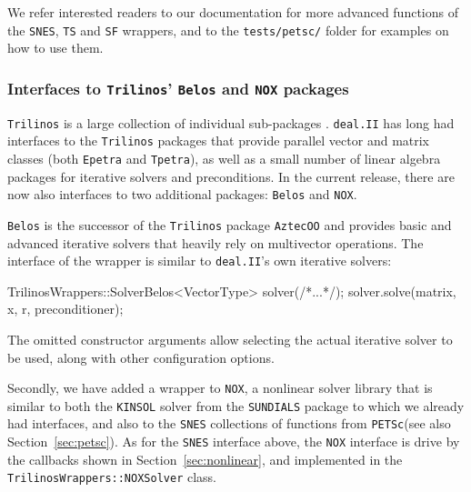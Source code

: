\documentclass{ansarticle-preprint}
\newcommand{\specialword}[1]{\texttt{#1}}
\newcommand{\dealii}{{\specialword{deal.II}}\xspace}
\newcommand{\trilinos}{{\specialword{Trilinos}}\xspace}
\newcommand{\petsc}{\specialword{PETSc}\xspace}
\newcommand{\snes}{{\specialword{SNES}}\xspace}
\newcommand{\ts}{{\specialword{TS}}\xspace}
\newcommand{\petscsf}{{\specialword{SF}}\xspace}
\newcommand{\sundials}{{\specialword{SUNDIALS}}\xspace}
\newcommand{\kinsol}{{\specialword{KINSOL}}\xspace}
\begin{document}
We refer interested readers to our documentation for more advanced
functions of the \snes, \ts and \petscsf wrappers, and to the {\tt tests/petsc/} folder
for examples on how to use them.


\subsubsection{Interfaces to \trilinos{}' \texttt{Belos} and \texttt{NOX} packages}\label{sec:trilinos}

\trilinos is a large collection of individual sub-packages \cite{heroux2005trilinos,trilinos-web-page}. \dealii{}
has long had interfaces to the \trilinos packages that provide parallel
vector and matrix classes (both \texttt{Epetra} and \texttt{Tpetra}),
as well as a small number of linear algebra packages for iterative
solvers and preconditions. In the current release, there are now also
interfaces to two additional packages: \texttt{Belos} and \texttt{NOX}.

\texttt{Belos} is the
successor of the \trilinos package \texttt{AztecOO} and provides basic and advanced iterative solvers
that heavily rely on multivector operations. The interface of the
wrapper is similar to \dealii{}'s own iterative solvers:
\begin{c++}
TrilinosWrappers::SolverBelos<VectorType> solver(/*...*/);
solver.solve(matrix, x, r, preconditioner);
\end{c++}
The omitted constructor arguments allow selecting the actual iterative
solver to be used, along with other configuration options.

Secondly, we have added a wrapper to \texttt{NOX}, a
nonlinear solver library that is similar to both the \kinsol{} solver from
the \sundials{} package to which we already had interfaces, and also
to the \snes{} collections of functions from \petsc (see also
Section~\ref{sec:petsc}). 
%
%
%
As for the \snes{} interface above, the \texttt{NOX} interface is
drive by the callbacks shown in Section~\ref{sec:nonlinear}, and
implemented in the \texttt{TrilinosWrappers::NOXSolver} class.
\end{document}

